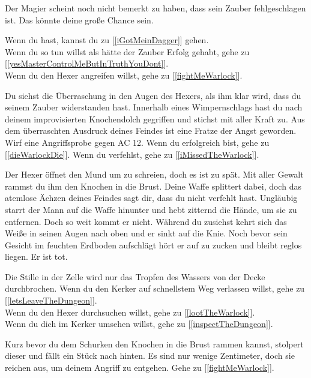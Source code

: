 Der Magier scheint noch nicht bemerkt zu haben, dass sein Zauber fehlgeschlagen ist. Das könnte deine große Chance sein.

Wenn du  hast, kannst du zu [\ref{iGotMeinDagger}] gehen.
\\Wenn du so tun willst als hätte der Zauber Erfolg gehabt, gehe zu [\ref{yesMasterControlMeButInTruthYouDont}].
\\Wenn du den Hexer angreifen willst, gehe zu [\ref{fightMeWarlock}].


Du siehst die Überraschung in den Augen des Hexers, als ihm klar wird, dass du seinem Zauber widerstanden hast. Innerhalb eines Wimpernschlags hast du nach deinem improvisierten Knochendolch gegriffen und stichst mit aller Kraft zu. Aus dem überraschten Ausdruck deines Feindes ist eine Fratze der Angst geworden.
Wirf eine Angriffsprobe gegen AC 12. Wenn du erfolgreich bist, gehe zu [\ref{dieWarlockDie}]. Wenn du verfehlst, gehe zu [\ref{iMissedTheWarlock}].


Der Hexer öffnet den Mund um zu schreien, doch es ist zu spät. Mit aller Gewalt rammst du ihm den Knochen in die Brust. Deine Waffe splittert dabei, doch das atemlose Ächzen deines Feindes sagt dir, dass du nicht verfehlt hast. Ungläubig starrt der Mann auf die Waffe hinunter und hebt zitternd die Hände, um sie zu entfernen. Doch so weit kommt er nicht. Während du zusiehst kehrt sich das Weiße in seinen Augen nach oben und er sinkt auf die Knie. Noch bevor sein Gesicht im feuchten Erdboden aufschlägt hört er auf zu zucken und bleibt reglos liegen. Er ist tot.

Die Stille in der Zelle wird nur das Tropfen des Wassers von der Decke durchbrochen. Wenn du den Kerker auf schnellstem Weg verlassen willst, gehe zu [\ref{letsLeaveTheDungeon}].
\\Wenn du den Hexer durchsuchen willst, gehe zu [\ref{lootTheWarlock}].
\\Wenn du dich im Kerker umsehen willst, gehe zu [\ref{inspectTheDungeon}].


Kurz bevor du dem Schurken den Knochen in die Brust rammen kannst, stolpert dieser und fällt ein Stück nach hinten. Es sind nur wenige Zentimeter, doch sie reichen aus, um deinem Angriff zu entgehen. Gehe zu [\ref{fightMeWarlock}].

